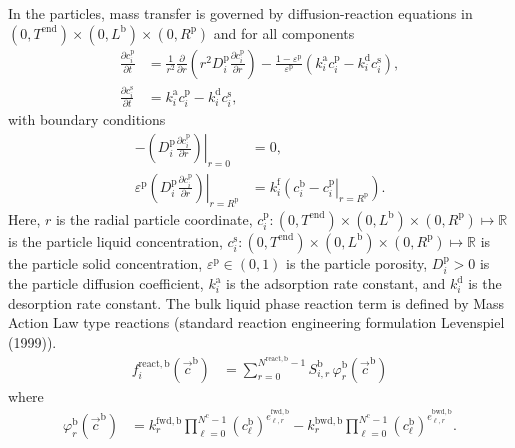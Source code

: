 \documentclass{article}
\begin{document}
In the particles, mass transfer is governed by diffusion-reaction equations in $(0, T^{\mathrm{end}}) \times (0, L^{\mathrm{b}})\times (0, R^{\mathrm{p}})$ and for all components
\begin{align}
    \frac{\partial c^{\mathrm{p}}_{i}}{\partial t}
    &= \frac{1}{r^{2}} \frac{\partial }{\partial r} \left( r^{2} D^{\mathrm{p}}_{i} \frac{\partial c^{\mathrm{p}}_{i}}{\partial r} \right)
        - \frac{1 - \varepsilon^{\mathrm{p}}}{\varepsilon^{\mathrm{p}}}\left(k^{\mathrm{a}}_{i} c^{\mathrm{p}}_{i} - k^{\mathrm{d}}_{i} c^{\mathrm{s}}_{i} \right),
    \\
    \frac{\partial c^{\mathrm{s}}_{i}}{\partial t}
    &= k^{\mathrm{a}}_{i} c^{\mathrm{p}}_{i}
        - k^{\mathrm{d}}_{i} c^{\mathrm{s}}_{i},
\end{align}
with boundary conditions
\begin{align}
    - \left. \left( D^{\mathrm{p}}_{i} \frac{\partial c^{\mathrm{p}}_{i}}{\partial r} \right) \right|_{r=0}
    &= 0,
    \\
    \varepsilon^{\mathrm{p}} \left. \left( D^{\mathrm{p}}_{i} \frac{\partial c^{\mathrm{p}}_{i}}{\partial r} \right)\right|_{r = R^{\mathrm{p}}}
    &= k^{\mathrm{f}}_{i} \left. \left( c^{\mathrm{b}}_{i} - c^{\mathrm{p}}_{i} \right|_{r = R^{\mathrm{p}}} \right).
\end{align}
Here, $r$ is the radial particle coordinate, $c^{\mathrm{p}}_{i}\colon (0, T^{\mathrm{end}}) \times (0, L^{\mathrm{b}})\times (0, R^{\mathrm{p}}) \mapsto \mathbb{R}$ is the particle liquid concentration, $c^{\mathrm{s}}_{i}\colon (0, T^{\mathrm{end}}) \times (0, L^{\mathrm{b}})\times (0, R^{\mathrm{p}}) \mapsto \mathbb{R}$ is the particle solid concentration, $\varepsilon^{\mathrm{p}}\in (0, 1)$ is the particle porosity, $D^{\mathrm{p}}_{i}> 0$ is the particle diffusion coefficient, $k^{\mathrm{a}}_{i}$ is the adsorption rate constant, and $k^{\mathrm{d}}_{i}$ is the desorption rate constant.
The bulk liquid phase reaction term is defined by Mass Action Law type reactions (standard reaction engineering formulation Levenspiel (1999)).
\begin{align}
    f^{\mathrm{react},\mathrm{b}}_{i}\left( \vec{c}^{\mathrm{b}} \right)
    &= \sum_{r=0}^{N^{\mathrm{react},\mathrm{b}}-1} S^{\mathrm{b}}_{i,r} \,\varphi^{\mathrm{b}}_{r}\left( \vec{c}^{\mathrm{b}} \right)
\end{align}
where
\begin{align}
    \varphi^{\mathrm{b}}_{r}\left( \vec{c}^{\mathrm{b}} \right)
    &= k^{\mathrm{fwd},\mathrm{b}}_{r} \prod_{\ell=0}^{N^{\mathrm{c}}-1} \left(c^{\mathrm{b}}_{\ell}\right)^{e^{\mathrm{fwd},\mathrm{b}}_{\ell,r}}
        - k^{\mathrm{bwd},\mathrm{b}}_{r} \prod_{\ell=0}^{N^{\mathrm{c}}-1} \left(c^{\mathrm{b}}_{\ell}\right)^{e^{\mathrm{bwd},\mathrm{b}}_{\ell,r}}.
\end{align}
\end{document}
